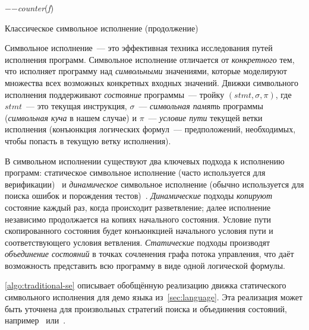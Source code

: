 {\begin{algorithm2e}
{		\;
	}
	 {
		\;
		$-$$-$\emph{counter}(\emph{f})\;
		\;
	}\label{algo:line:call-func-end}
	\BlankLine
\caption{Классическое символьное исполнение (продолжение)}
\end{algorithm2e}
}

Символьное исполнение~--- это эффективная техника исследования путей исполнения программ. Символьное исполнение отличается от \emph{конкретного} тем, что исполняет программу над \emph{символьными} значениями, которые моделируют множества всех возможных конкретных входных значений. Движки символьного исполнения поддерживают \emph{состояние} программы~--- тройку $(stmt, \sigma, \pi)$, где $stmt$~--- это текущая инструкция, $\sigma$~--- \emph{символьная память} программы (\emph{символьная куча} в нашем случае) и $\pi$~--- \emph{условие пути} текущей ветки исполнения (конъюнкция логических формул~--- предположений, необходимых, чтобы попасть в текущую ветку исполнения).

В символьном исполнении существуют два ключевых подхода к исполнению программ: статическое символьное исполнение (часто используется для верификации)~\cite{koelbl2005constructing,babic2008calysto,dillig2008sound,xie2005scalable} и \emph{динамическое} символьное исполнение (обычно используется для поиска ошибок и порождения тестов)~\cite{tillmann2008pex,godefroid2005dart,bounimova2013billions}. \emph{Динамические} подходы \emph{копируют} состояние каждый раз, когда происходит разветвление; далее исполнение независимо продолжается на копиях начального состояния. Условие пути скопированного состояния будет конъюнкцией начального условия пути и соответствующего условия ветвления. \emph{Статические} подходы производят \emph{объединение состояний} в точках сочленения графа потока управления, что даёт возможность представить всю программу в виде одной логической формулы.

\traditionalalgo

\autoref{algo:traditional-se} описывает обобщённую реализацию движка статического символьного исполнения для демо языка из~\autoref{sec:language}. Эта реализация может быть уточнена для произвольных стратегий поиска и объединения состояний, например~\cite{kuznetsov2012efficient} или~\cite{avgerinos2014enhancing}.

